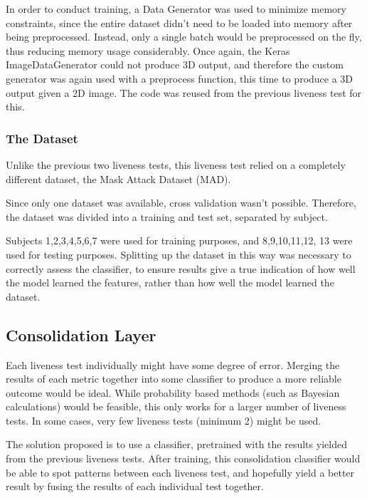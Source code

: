 \documentclass[12pt,a4paper]{article}
\begin{document}
            In order to conduct training, a Data Generator was used to minimize memory constraints, since the entire dataset didn't need to be loaded into memory after being preprocessed. Instead,
            only a single batch would be preprocessed on the fly, thus reducing memory usage considerably. Once again, the Keras ImageDataGenerator could not produce 3D output, and therefore
            the custom generator was again used with a preprocess function, this time to produce a 3D output given a 2D image. The code was reused from the previous liveness test for this.

        \subsubsection{The Dataset}
            Unlike the previous two liveness tests, this liveness test relied on a completely different dataset, the Mask Attack Dataset (MAD). \cite{3DMadDataset}

            Since only one dataset was available, cross validation wasn't possible. Therefore, the dataset was divided into a training and test set, separated by subject.

            Subjects 1,2,3,4,5,6,7 were used for training purposes, and 8,9,10,11,12, 13 were used for testing purposes. Splitting up the dataset in this way was necessary to correctly assess the classifier,
            to ensure results give a true indication of how well the model learned the features, rather than how well the model learned the dataset.

    \subsection{Consolidation Layer}
        Each liveness test individually might have some degree of error. Merging the results of each metric together into some classifier to produce a more reliable outcome would be ideal.
        While probability based methods (such as Bayesian calculations) would be feasible, this only works for a larger number of liveness tests. In some cases, very few liveness tests (minimum 2)
        might be used. 

        The solution proposed is to use a classifier, pretrained with the results yielded from the previous liveness tests. After training, this consolidation classifier would be able to spot patterns
        between each liveness test, and hopefully yield a better result by fusing the results of each individual test together. 
        
\end{document}
